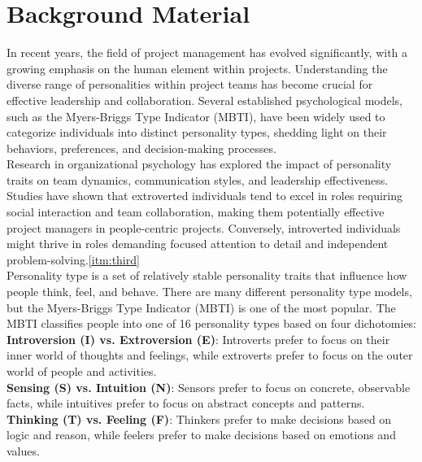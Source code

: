 \documentclass[a4Paper]{article}
\begin{document}
\pagebreak

\section{Background Material}

In recent years, the field of project management has evolved significantly, with a growing emphasis on the human element within projects. Understanding the diverse range of personalities within project teams has become crucial for effective leadership and collaboration. Several established psychological models, such as the Myers-Briggs Type Indicator (MBTI), have been widely used to categorize individuals into distinct personality types, shedding light on their behaviors, preferences, and decision-making processes.\\

Research in organizational psychology has explored the impact of personality traits on team dynamics, communication styles, and leadership effectiveness. Studies have shown that extroverted individuals tend to excel in roles requiring social interaction and team collaboration, making them potentially effective project managers in people-centric projects. Conversely, introverted individuals might thrive in roles demanding focused attention to detail and independent problem-solving.\ref{itm:third}\\

Personality type is a set of relatively stable personality traits that influence how people think, feel, and behave. There are many different personality type models, but the Myers-Briggs Type Indicator (MBTI) is one of the most popular. The MBTI classifies people into one of 16 personality types based on four dichotomies:\\

\textbf{Introversion (I) vs. Extroversion (E)}: Introverts prefer to focus on their inner world of thoughts and feelings, while extroverts prefer to focus on the outer world of people and activities.\\

\textbf{Sensing (S) vs. Intuition (N)}: Sensors prefer to focus on concrete, observable facts, while intuitives prefer to focus on abstract concepts and patterns.\\

\textbf{Thinking (T) vs. Feeling (F)}: Thinkers prefer to make decisions based on logic and reason, while feelers prefer to make decisions based on emotions and values.\\
\end{document}
